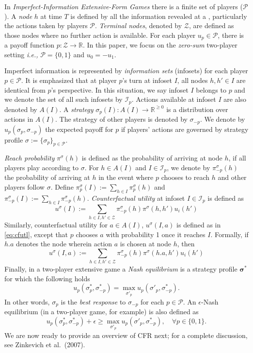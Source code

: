 
In \textit{Imperfect-Information Extensive-Form Games} there is a finite set of players ($\mathcal{P}$). A \textit{node} $h$ at time $T$ is defined by all the information revealed at a , particularly the actions taken by players $\mathcal{P}$. \textit{Terminal nodes}, denoted by $\mathcal{Z}$, are defined as those nodes where no further action is available. For each player $u_p\in \mathcal{P}$, there is a payoff function $p:\mathcal{Z}\to \mathbb{R}$. In this paper, we focus on the \textit{zero-sum} two-player setting \textit{i.e.,}  $\mathcal{P}=\{0,1\}$ and $u_0=-u_1$. 

Imperfect information is represented by \textit{information sets}
(infosets) for each player $p\in \mathcal{P}$. It is emphasized that at player $p$'s turn at infoset $I$, all nodes $h,h'\in I$ are identical from $p$'s perspective. In this situation, we say infoset $I$ belongs to $p$ and we denote the set of all such infosets by $\mathcal{I}_p$. Actions available at infoset $I$ are also denoted by $A(I)$. A \textit{strategy} $\sigma_p(I):A(I)\to \mathbb{R}^{\geq 0}$ is a distribution over actions in $A(I)$. The strategy of other players is denoted by $\sigma_{-p}$. We denote by $u_p(\sigma_p,\sigma_{-p})$ the expected payoff for $p$ if players' actions are governed by strategy profile $\sigma:=\{\sigma_p\}_{p\in \mathcal{P}}$. 

\textit{Reach probability} $\pi^{\sigma}(h)$ is defined as the probability of arriving at node $h$, if all players play according to $\sigma$. For $h\in A(I)$ and $I\in \mathcal{I}_p$, we denote by $\pi^{\sigma}_{-p}(h)$ the probability of arriving at $h$ in the event where $p$ chooses to reach $h$ and other players follow $\sigma$. Define $\pi^{\sigma}_p(I):=\sum_{h\in I} \pi^{\sigma}_p(h)$ and $\pi^{\sigma}_{-p}(I):=\sum_{h\in I} \pi^{\sigma}_{-p}(h)$. \textit{Counterfactual utility} at infoset $I\in \mathcal{I}_p$ is defined as 
\begin{equation}\label{eq:cfutl}
    u^{\sigma}(I) := \sum_{h\in I, h'\in \mathcal{Z}}  \pi^{\sigma}_{-p}(h)\pi^{\sigma}(h,h')u_i(h')
\end{equation}
Similarly, counterfactual utility for $a\in A(I)$, $u^{\sigma}(I,a)$ is defined as in \eqref{eq:cfutl}, except that $p$ chooses $a$ with probability 1 once it reaches $I$. Formally, if $h.a$ denotes the node wherein action $a$ is chosen at node $h$, then 
\begin{equation}\label{eq:cfutl}
    u^{\sigma}(I,a) := \sum_{h\in I, h'\in \mathcal{Z}}  \pi^{\sigma}_{-p}(h)\pi^{\sigma}(h.a,h')u_i(h')
\end{equation}
Finally, in a two-player extensive game a \textit{Nash equilibrium} \cite{nash1950equilibrium} is a strategy profile $\boldsymbol{\sigma}^*$ for which the following holds
\[
u_p(\sigma^*_p,\sigma^*_{-p}) = \max_{\sigma'_p}u_p(\sigma'_p, \sigma^*_{-p}).
\]
In other words, $\sigma_p$ is the \textit{best response} to $\sigma_{-p}$ for each $p\in \mathcal{P}$. An $\epsilon$-Nash equilibrium (in a two-player game, for example) is also defined as 
\[
u_p(\sigma^*_p,\sigma^*_{-p}) +\epsilon \geq \max_{\sigma'_p}  u_p(\sigma'_p, \sigma^*_{-p}), \quad \forall p\in \{0,1\}.
\]
We are now ready to provide an overview of CFR next; for a complete discussion, see Zinkevich et al.\ (2007). 

